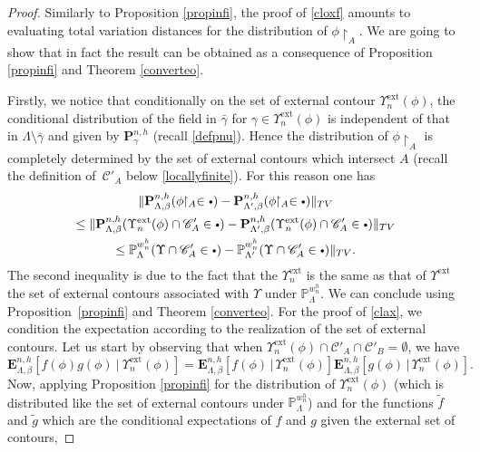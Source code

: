 \documentclass[JEP,XML,SOM,Unicode, NoFloatCountersInSection]{cedram}
\let\mathcal\mathscr
\newcommand{\sbullet}{{\scriptscriptstyle\bullet}}
\newcommand{\csbullet}{{\raisebox{1pt}{$\sbullet$}}}
\numberwithin{equation}{section}
\theoremstyle{plain}
\theoremstyle{definition}
\newcommand{\ext}{\mathrm{ext}}
\newcommand{\restrict}{\!\!\upharpoonright}
\newcommand{\cC}{{\ensuremath{\mathcal C}} }
\newcommand{\bP}{{\ensuremath{\mathbf P}} }
\newcommand{\bE}{{\ensuremath{\mathbf E}} }
\newcommand{\bbP}{{\ensuremath{\mathbb P}} }
\newcommand{\gb}{\beta}
\newcommand{\gL}{\Lambda}
\begin{document}
\begin{proof}
Similarly to Proposition \ref{propinfi}, the proof of \eqref{cloxf} amounts to evaluating total variation distances for the distribution of $\phi\restrict_A$.
We are going to show that in fact the result can be obtained as a consequence of Proposition \ref{propinfi} and Theorem \ref{converteo}.

Firstly, we notice that conditionally on the set of external contour $\Upsilon^{\ext}_n(\phi)$,
the conditional distribution of the field in $\bar \gamma$ for $\gamma \in \Upsilon^{\ext}_n(\phi)$ is independent of that in $\gL\setminus \bar \gamma$
and given by $\bP_{\gamma}^{n,h}$ (recall \eqref{defpnu}).
Hence the distribution of $\phi\restrict_{A}$ is completely determined by the set of external contours which intersect $A$ (recall the definition of~$\cC'_A$ below
\eqref{locallyfinite}). For this reason one has
\begin{multline*}%
\| \bP^{n,h}_{\gL,\gb}(\phi\restrict_A\in\csbullet)- \bP^{n,h}_{\gL',\gb}(\phi\restrict_A\in\csbullet)\|_{TV}\\\le
\| \bP^{n,h}_{\gL,\gb}(\Upsilon^{\ext}_n(\phi) \cap \cC'_{A}\in\csbullet)- \bP^{n,h}_{\gL',\gb}(\Upsilon^{\ext}_n(\phi) \cap \cC'_{A}\in\csbullet)\|_{TV}\\
\le \bbP^{w^{h}_{n}}_{\gL}(\Upsilon \cap \cC'_{A}\in\csbullet)- \bbP^{w^{h}_{n}}_{\gL'}(\Upsilon \cap \cC'_{A}\in\csbullet)\|_{TV}.
\end{multline*}
The second inequality is due to the fact that the $\Upsilon^{\ext}_n$ is the same as that of $\Upsilon^{\ext}$
the set of external contours associated with $\Upsilon$ under $\bbP^{w^{h}_{n}}_{\gL}$.
We can conclude using Proposition~\ref{propinfi} and Theorem \ref{converteo}.
For the proof of \eqref{clax}, we condition the expectation according to the realization of the set of external contours.
Let us start by observing that when $\Upsilon^{\ext}_n(\phi)\cap \cC'_A \cap \cC'_B=\emptyset$, we have
\begin{equation}\label{troum}
\bE^{n,h}_{\gL,\gb}[f(\phi)g(\phi) \ | \ \Upsilon^{\ext}_n(\phi)]= \bE^{n,h}_{\gL,\gb}[f(\phi) \, | \, \Upsilon^{\ext}_n(\phi)] \bE^{n,h}_{\gL,\gb}[g(\phi) \, | \,
\Upsilon^{\ext}_n(\phi)].
\end{equation}
Now, applying Proposition \ref{propinfi} for the distribution of $\Upsilon^{\ext}_n(\phi)$ (which is distributed like the set of external contours under
$\bbP^{w^{h}_{n}}_{\gL}$) and for the functions $\tilde f$ and $\tilde g$ which are the conditional expectations of $f$ and $g$ given the external set of contours,

\end{proof}
\end{document}
